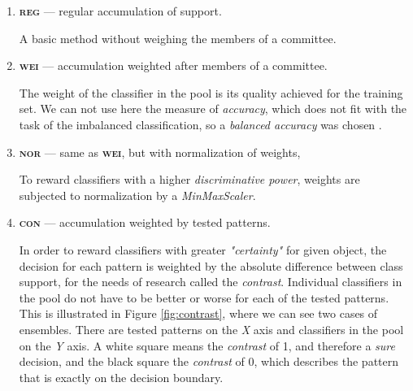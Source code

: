 \documentclass[pmlr]{jmlr}
\begin{document}
\begin{enumerate}
	\item \textbf{\textsc{reg}} --- regular accumulation of support.

A basic method without weighing the members of a committee.

	\item \textbf{\textsc{wei}} --- accumulation weighted after members of a committee.

The weight of the classifier in the pool is its quality achieved for the training set. We can not use here the measure of \emph{accuracy}, which does not fit with the task of the imbalanced classification, so a \emph{balanced accuracy} was chosen \citep{brodersen2010balanced}.

	\item \textbf{\textsc{nor}} --- same as \textbf{\textsc{wei}}, but with normalization of weights,

To reward classifiers with a higher \emph{discriminative power}, weights are subjected to normalization by a \emph{MinMaxScaler}.
	
	\item \textbf{\textsc{con}} --- accumulation weighted by tested patterns.
	
In order to reward classifiers with greater \emph{"certainty"} for given object, the decision for each pattern is weighted by the absolute difference between class support, for the needs of research called the \emph{contrast}. Individual classifiers in the pool do not have to be better or worse for each of the tested patterns. This is illustrated in Figure \ref{fig:contrast}, where we can see two cases of ensembles. There are tested patterns on the \emph{X} axis and classifiers in the pool on the \emph{Y} axis. A white square means the \emph{contrast} of 1, and therefore a \emph{sure} decision, and the black square the \emph{contrast} of 0, which describes the pattern that is exactly on the decision boundary.
	

\end{enumerate}
\end{document}
